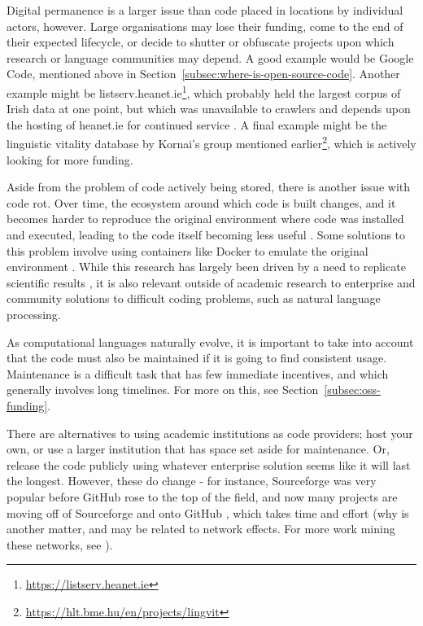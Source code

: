 Digital permanence is a larger issue than code placed in locations by individual actors, however. Large organisations may lose their funding, come to the end of their expected lifecycle, or decide to shutter or obfuscate projects upon which research or language communities may depend. A good example would be Google Code, mentioned above in Section~\ref{subsec:where-is-open-source-code}. Another example might be listserv.heanet.ie\footnote{\href{https://listserv.heanet.ie}{https://listserv.heanet.ie}}, which probably held the largest corpus of Irish data at one point, but which was unavailable to crawlers and depends upon the hosting of heanet.ie for continued service \citep{scannell2007crubadan}. A final example might be the linguistic vitality database by Kornai's group mentioned earlier\footnote{\href{https://hlt.bme.hu/en/projects/lingvit}{https://hlt.bme.hu/en/projects/lingvit}}, which is actively looking for more funding.

Aside from the problem of code actively being stored, there is another issue with code rot. Over time, the ecosystem around which code is built changes, and it becomes harder to reproduce the original environment where code was installed and executed, leading to the code itself becoming less useful \citep{eide2010toward}. Some solutions to this problem involve using containers like Docker to emulate the original environment \citep{boettiger2015introduction}. While this research has largely been driven by a need to replicate scientific results \citep{schwab2000making, barnes2010publish, ince2012case}, it is also relevant outside of academic research to enterprise and community solutions to difficult coding problems, such as natural language processing.

As computational languages naturally evolve, it is important to take into account that the code must also be maintained if it is going to find consistent usage. Maintenance is a difficult task that has few immediate incentives, and which generally involves long timelines. For more on this, see Section~\ref{subsec:oss-funding}.


There are alternatives to using academic institutions as code providers; host your own, or use a larger institution that has space set aside for maintenance. Or, release the code publicly using whatever enterprise solution seems like it will last the longest. However, these do change - for instance, Sourceforge was very popular before GitHub rose to the top of the field, and now many projects are moving off of Sourceforge and onto GitHub \citep{finley2011github}, which takes time and effort (why is another matter, and may be related to network effects. For more work mining these networks, see \citet{thung2013network, kalliamvakou2014promises}).

